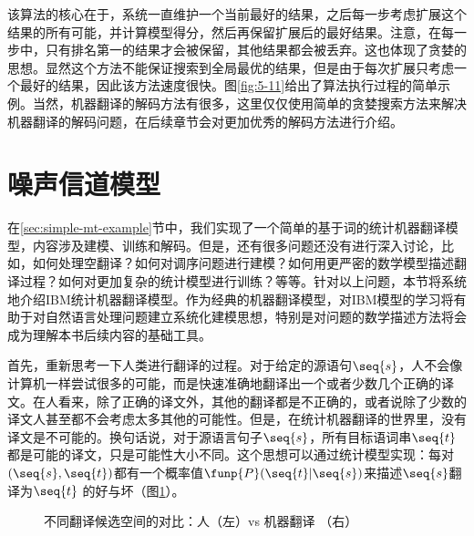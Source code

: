 \parinterval 该算法的核心在于，系统一直维护一个当前最好的结果，之后每一步考虑扩展这个结果的所有可能，并计算模型得分，然后再保留扩展后的最好结果。注意，在每一步中，只有排名第一的结果才会被保留，其他结果都会被丢弃。这也体现了贪婪的思想。显然这个方法不能保证搜索到全局最优的结果，但是由于每次扩展只考虑一个最好的结果，因此该方法速度很快。图\ref{fig:5-11}给出了算法执行过程的简单示例。当然，机器翻译的解码方法有很多，这里仅仅使用简单的贪婪搜索方法来解决机器翻译的解码问题，在后续章节会对更加优秀的解码方法进行介绍。

\sectionnewpage
\section{噪声信道模型}

\vspace{0.5em}

\parinterval 在\ref{sec:simple-mt-example}节中，我们实现了一个简单的基于词的统计机器翻译模型，内容涉及建模、训练和解码。但是，还有很多问题还没有进行深入讨论，比如，如何处理空翻译？如何对调序问题进行建模？如何用更严密的数学模型描述翻译过程？如何对更加复杂的统计模型进行训练？等等。针对以上问题，本节将系统地介绍IBM统计机器翻译模型。作为经典的机器翻译模型，对IBM模型的学习将有助于对自然语言处理问题建立系统化建模思想，特别是对问题的数学描述方法将会成为理解本书后续内容的基础工具。

\parinterval 首先，重新思考一下人类进行翻译的过程。对于给定的源语句$\seq{s}$，人不会像计算机一样尝试很多的可能，而是快速准确地翻译出一个或者少数几个正确的译文。在人看来，除了正确的译文外，其他的翻译都是不正确的，或者说除了少数的译文人甚至都不会考虑太多其他的可能性。但是，在统计机器翻译的世界里，没有译文是不可能的。换句话说，对于源语言句子$\seq{s}$，所有目标语词串$\seq{t}$都是可能的译文，只是可能性大小不同。这个思想可以通过统计模型实现：每对$(\seq{s},\seq{t})$都有一个概率值$\funp{P}(\seq{t}|\seq{s})$来描述$\seq{s}$翻译为$\seq{t}$ 的好与坏（图\ref{fig:5-12}）。

\begin{figure}[htp]
    \centering

\caption{不同翻译候选空间的对比：人（左）vs 机器翻译 （右）}
    \label{fig:5-12}
\end{figure}

